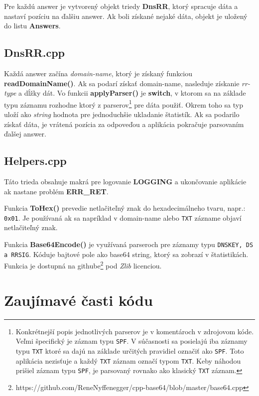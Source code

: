 \documentclass{article}
\begin{document}
        Pre každú answer je vytvorený objekt triedy \textbf{DnsRR}, ktorý spracuje dáta a nastaví pozíciu na ďalšiu answer. Ak boli získané nejaké dáta, objekt je uložený do listu
        \textbf{Answers}.

        \newpage

        \subsection{DnsRR.cpp}
        Každá answer začína \emph{domain-name}, ktorý je získaný funkciou \textbf{readDomainName()}. Ak sa podarí získať domain-name, nasleduje získanie \emph{rr-type} a dĺžky dát.
        Vo funkcii \textbf{applyParser()} je \textbf{switch}, v ktorom sa na základe typu záznamu rozhodne ktorý z parserov\footnote{Konkrétnejší popis jednotlivých parserov je v komentároch v zdrojovom kóde. 
        Veľmi špecifický je záznam typu \texttt{SPF}. V súčasnosti sa posielajú iba záznamy typu \texttt{TXT} ktoré sa dajú na základe určitých pravidiel označiť ako \texttt{SPF}. Toto aplikácia nezisťuje
        a každý \texttt{TXT} záznam označí typom \texttt{TXT}. Keby náhodou prišiel záznam typu \texttt{SPF}, je parsovaný rovnako ako klasický \texttt{TXT} záznam.} pre dáta použiť. Okrem toho sa typ uloží ako \emph{string}
        hodnota pre jednoduchšie ukladanie štatistík. Ak sa podarilo získať dáta, je vrátená pozícia za odpoveďou a aplikácia pokračuje parsovaním ďalšej answer.

        \subsection{Helpers.cpp}
        Táto trieda obsahuje makrá pre logovanie \textbf{LOGGING} a ukončovanie aplikácie ak nastane problém \textbf{ERR\_RET}.

        Funkcia \textbf{ToHex()} prevedie netlačiteľný znak do hexadecimálneho tvaru, napr.: \texttt{0x01}. Je používaná ak sa napríklad v domain-name alebo \texttt{TXT}
        zázname objaví netlačiteľný znak.

        Funkcia \textbf{Base64Encode()} je využívaná parseroch pre záznamy typu \texttt{DNSKEY, DS a RRSIG}. Kóduje bajtové pole ako base64 string, ktorý sa zobrazí v štatistikách.
        Funkcia je dostupná na githube\footnote{https://github.com/ReneNyffenegger/cpp-base64/blob/master/base64.cpp} pod \emph{Zlib} licenciou. 

        \newpage

    \section{Zaujímavé časti kódu}
\end{document}
